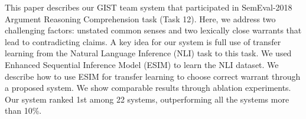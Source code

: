 This paper describes our GIST team system that participated in SemEval-2018 Argument Reasoning Comprehension task (Task 12).  Here, we address two challenging factors: unstated common senses and two lexically close warrants that lead to contradicting claims. A key idea for our system is full use of transfer learning from the Natural Language Inference (NLI) task to this task. We used Enhanced Sequential Inference Model (ESIM) to learn the NLI dataset. We describe how to use ESIM for transfer learning to choose correct warrant through a proposed system. We show comparable results through ablation experiments. Our system ranked 1st among 22 systems, outperforming all the systems more than 10\%.
